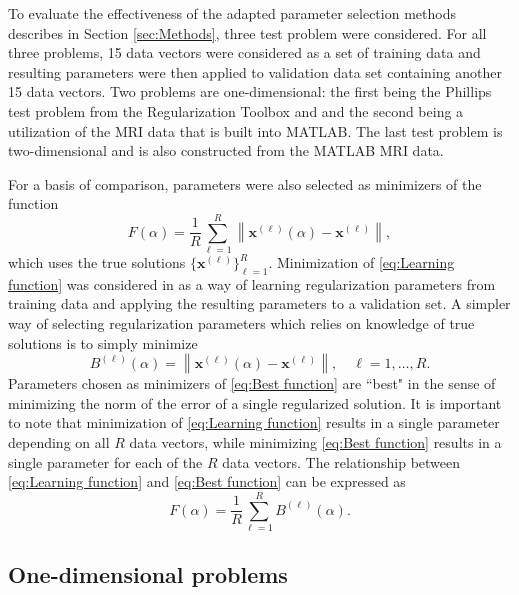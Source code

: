 \documentclass[12pt]{article}
\newcommand{\xVec}{\mathbf{x}}	%
\newcommand{\regparam}{\alpha}
\begin{document}
To evaluate the effectiveness of the adapted parameter selection methods describes in Section \ref{sec:Methods}, three test problem were considered. For all three problems, 15 data vectors were considered as a set of training data and resulting parameters were then applied to validation data set containing another 15 data vectors. Two problems are one-dimensional: the first being the Phillips test problem from the Regularization Toolbox \cite{Regtools} and and the second being a utilization of the MRI data that is built into MATLAB. The last test problem is two-dimensional and is also constructed from the MATLAB MRI data. \par 
For a basis of comparison, parameters were also selected as minimizers of the function
\begin{equation}
\label{eq:Learning function}
F(\regparam) = \frac{1}{R}\sum_{\ell=1}^R \left\|\xVec^{(\ell)}(\regparam) - \xVec^{(\ell)}\right\|,
\end{equation} 
which uses the true solutions $\{\xVec^{(\ell)}\}_{\ell=1}^R$. Minimization of \eqref{eq:Learning function} was considered in \cite{ChungEspanol2017} as a way of learning regularization parameters from training data and applying the resulting parameters to a validation set. A simpler way of selecting regularization parameters which relies on knowledge of true solutions is to simply minimize
\begin{equation}
\label{eq:Best function}
B^{(\ell)}(\regparam) = \left\|\xVec^{(\ell)}(\regparam) - \xVec^{(\ell)}\right\|, \quad \ell = 1,\ldots,R.
\end{equation}
Parameters chosen as minimizers of \eqref{eq:Best function} are ``best" in the sense of minimizing the norm of the error of a single regularized solution. It is important to note that minimization of \eqref{eq:Learning function} results in a single parameter depending on all $R$ data vectors, while minimizing \eqref{eq:Best function} results in a single parameter for each of the $R$ data vectors. The relationship between \eqref{eq:Learning function} and \eqref{eq:Best function} can be expressed as
\[F(\regparam) = \frac{1}{R}\sum_{\ell=1}^R B^{(\ell)}(\regparam).\]

\subsection{One-dimensional problems} \label{sec:1D}
\end{document}
